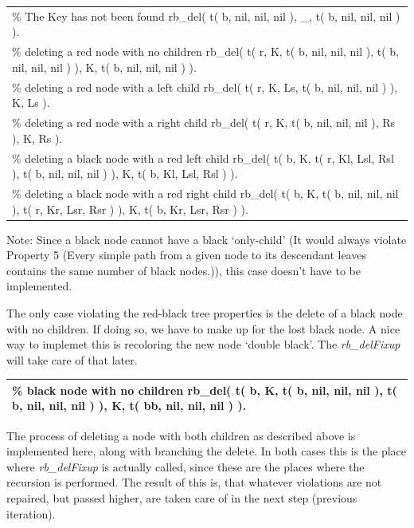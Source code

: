 \documentclass{article}
\newenvironment{code}{\obeycr\begin{it}\nopagebreak\addvspace{1ex}\noindent\footnotesize\begin{tabular}{|p{0.95\textwidth}|}\hline}{\\\hline\end{tabular}\par\addvspace{1ex}\end{it}\restorecr}
\newcommand{\inlinecode}[1]{\textit{#1}}
\begin{document}
\begin{code}
\% The Key has not been found
rb\_del( t( b, nil, nil, nil ),  \_, t( b, nil, nil, nil ) ).\\
\% deleting a red node with no children
rb\_del( t( r, K, t( b, nil, nil, nil ), t( b, nil, nil, nil ) ), K, t( b, nil, nil, nil ) ).\\
\% deleting a red node with a left child
rb\_del( t( r, K, Ls, t( b, nil, nil, nil ) ), K, Ls ).\\
\% deleting a red node with a right child
rb\_del( t( r, K, t( b, nil, nil, nil ), Rs ), K, Rs ).\\
\% deleting a black node with a red left child
rb\_del( t( b, K, t( r, Kl, Lsl, Rsl ), t( b, nil, nil, nil ) ), K, t( b, Kl, Lsl, Rsl ) ).\\
\% deleting a black node with a red right child
rb\_del( t( b, K, t( b, nil, nil, nil ), t( r, Kr, Lsr, Rsr ) ), K, t( b, Kr, Lsr, Rsr ) ).
\end{code}

Note: Since a black node cannot have a black `only-child' (It would always violate Property 5 (Every simple path from a given node to its descendant leaves contains the same number of black nodes.)), this case doesn't have to be implemented.

The only case violating the red-black tree properties is the delete of a black node with no children. If doing so, we have to make up for the lost black node. A nice way to implemet this is recoloring the new node \label{double_black}`double black'. The \inlinecode{rb\_delFixup} will take care of that later.

\begin{code}
\% black node with no children
rb\_del( t( b, K, t( b, nil, nil, nil ), t( b, nil, nil, nil ) ), K, t( bb, nil, nil, nil ) ).
\end{code}

\pagebreak
The process of deleting a node with both children as described above is implemented here, along with branching the delete. In both cases this is the place where \inlinecode{rb\_delFixup} is actually called, since these are the places where the recursion is performed. The result of this is, that whatever violations are not repaired, but passed higher, are taken care of in the next step (previous iteration).
\end{document}
